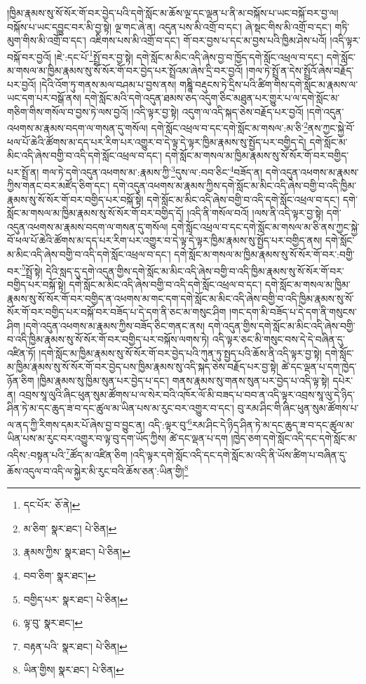 །ཁྱིམ་རྣམས་སུ་སོ་སོར་གོ་བར་བྱེད་པའི་དགེ་སློང་མ་ཆོས་ལྔ་དང་ལྡན་པ་ནི་མ་བསྐོས་པ་ཡང་བསྐོ་བར་བྱ་ལ། བསྐོས་པ་ཡང་དབྱུང་བར་མི་བྱ་སྟེ། ལྔ་གང་ཞེ་ན། འདུན་པས་མི་འགྲོ་བ་དང་། ཞེ་སྡང་གིས་མི་འགྲོ་བ་དང་། གཏི་མུག་གིས་མི་འགྲོ་བ་དང་། འཇིགས་པས་མི་འགྲོ་བ་དང་། གོ་བར་བྱས་པ་དང་མ་བྱས་པའི་ཁྱིམ་ཤེས་པའོ། །འདི་ལྟར་བསྐོ་བར་བྱའོ། །ཇེ་:དང་པོ་\footnote{དང་པོར་  ཅོ་ནེ། }སྤྲོ་བར་བྱ་སྟེ། དགེ་སློང་མ་མིང་འདི་ཞེས་བྱ་བ་ཁྱོད་དགེ་སློང་འཕྲལ་བ་དང་། དགེ་སློང་མ་གསལ་མ་ཁྱིམ་རྣམས་སུ་སོ་སོར་གོ་བར་བྱེད་པར་སྤྲོའམ་ཞེས་དྲི་བར་བྱའོ། །གལ་ཏེ་སྤྲོ་ན་དེས་སྤྲོའོ་ཞེས་བརྗོད་པར་བྱའོ། །དེའི་འོག་ཏུ་གནས་མལ་བཤམ་པ་བྱས་ནས། གཎྜཱི་བརྡུངས་ཏེ་དྲིས་པའི་ཚིག་གིས་དགེ་སློང་མ་རྣམས་ལ་ཡང་དག་པར་བསྒོ་ནས། དགེ་སློང་མའི་དགེ་འདུན་ཐམས་ཅད་འདུག་ཅིང་མཐུན་པར་གྱུར་པ་ལ་དགེ་སློང་མ་གཅིག་གིས་གསོལ་བ་བྱས་ཏེ་ལས་བྱའོ། །འདི་ལྟར་བྱ་སྟེ། འདུག་ལ་འདི་སྐད་ཅེས་བརྗོད་པར་བྱའོ། །དགེ་འདུན་འཕགས་མ་རྣམས་བདག་ལ་གསན་དུ་གསོལ། དགེ་སློང་འཕྲལ་བ་དང་དགེ་སློང་མ་གསལ་:མ་ཅི་\footnote{མ་ཅིག་  སྣར་ཐང་།  པེ་ཅིན། }ནས་ཀྱང་སྐྱེ་བོ་ཕལ་པོ་ཆེའི་ཚོགས་མ་དད་པར་རིག་པར་འགྱུར་བ་དེ་ལྟ་དེ་ལྟར་ཁྱིམ་རྣམས་སུ་སྤྱོད་པར་བགྱིད་དེ། དགེ་སློང་མ་མིང་འདི་ཞེས་བགྱི་བ་འདི་དགེ་སློང་འཕྲལ་བ་དང་། དགེ་སློང་མ་གསལ་མ་ཁྱིམ་རྣམས་སུ་སོ་སོར་གོ་བར་བགྱིད་པར་སྤྲོ་ན། གལ་ཏེ་དགེ་འདུན་འཕགས་མ་:རྣམས་ཀྱི་\footnote{རྣམས་ཀྱིས་  སྣར་ཐང་།  པེ་ཅིན། }དུས་ལ་:བབ་ཅིང་\footnote{བབ་ཅིག་  སྣར་ཐང་། }བཟོད་ན། དགེ་འདུན་འཕགས་མ་རྣམས་ཀྱིས་གནང་བར་མཛོད་ཅིག་དང་། དགེ་འདུན་འཕགས་མ་རྣམས་ཀྱིས་དགེ་སློང་མ་མིང་འདི་ཞེས་བགྱི་བ་འདི་ཁྱིམ་རྣམས་སུ་སོ་སོར་གོ་བར་བགྱིད་པར་བསྐོ་སྟེ། དགེ་སློང་མ་མིང་འདི་ཞེས་བགྱི་བ་འདི་དགེ་སློང་འཕྲལ་བ་དང་། དགེ་སློང་མ་གསལ་མ་ཁྱིམ་རྣམས་སུ་སོ་སོར་གོ་བར་བགྱིད་དོ། །འདི་ནི་གསོལ་བའོ། །ལས་ནི་འདི་ལྟར་བྱ་སྟེ། དགེ་འདུན་འཕགས་མ་རྣམས་བདག་ལ་གསན་དུ་གསོལ། དགེ་སློང་འཕྲལ་བ་དང་དགེ་སློང་མ་གསལ་མ་ཅི་ནས་ཀྱང་སྐྱེ་བོ་ཕལ་པོ་ཆེའི་ཚོགས་མ་དད་པར་རིག་པར་འགྱུར་བ་དེ་ལྟ་དེ་ལྟར་ཁྱིམ་རྣམས་སུ་སྤྱོད་པར་བགྱིད་ནས། དགེ་སློང་མ་མིང་འདི་ཞེས་བགྱི་བ་འདི་དགེ་སློང་འཕྲལ་བ་དང་། དགེ་སློང་མ་གསལ་མ་ཁྱིམ་རྣམས་སུ་སོ་སོར་གོ་བར་:བགྱི་བར་\footnote{བགྱིད་པར་  སྣར་ཐང་།  པེ་ཅིན། }སྤྲོ་སྟེ། དེའི་སླད་དུ་དགེ་འདུན་གྱིས་དགེ་སློང་མ་མིང་འདི་ཞེས་བགྱི་བ་འདི་ཁྱིམ་རྣམས་སུ་སོ་སོར་གོ་བར་བགྱིད་པར་བསྐོ་སྟེ། དགེ་སློང་མ་མིང་འདི་ཞེས་བགྱི་བ་འདི་དགེ་སློང་འཕྲལ་བ་དང་། དགེ་སློང་མ་གསལ་མ་ཁྱིམ་རྣམས་སུ་སོ་སོར་གོ་བར་བགྱིད་ན་འཕགས་མ་གང་དག་དགེ་སློང་མ་མིང་འདི་ཞེས་བགྱི་བ་འདི་ཁྱིམ་རྣམས་སུ་སོ་སོར་གོ་བར་བགྱིད་པར་བསྐོ་བར་བཟོད་པ་དེ་དག་ནི་ཅང་མ་གསུང་ཤིག །གང་དག་མི་བཟོད་པ་དེ་དག་ནི་གསུངས་ཤིག །དགེ་འདུན་འཕགས་མ་རྣམས་ཀྱིས་བཟོད་ཅིང་གནང་ནས། དགེ་འདུན་གྱིས་དགེ་སློང་མ་མིང་འདི་ཞེས་བགྱི་བ་འདི་ཁྱིམ་རྣམས་སུ་སོ་སོར་གོ་བར་བགྱིད་པར་བསྐོས་ལགས་ཏེ། འདི་ལྟར་ཅང་མི་གསུང་བས་དེ་དེ་བཞིན་དུ་འཛིན་ཏོ། །དགེ་སློང་མ་ཁྱིམ་རྣམས་སུ་སོ་སོར་གོ་བར་བྱེད་པའི་ཀུན་ཏུ་སྤྱད་པའི་ཆོས་ནི་འདི་ལྟར་བྱ་སྟེ། དགེ་སློང་མ་ཁྱིམ་རྣམས་སུ་སོ་སོར་གོ་བར་བྱེད་པས་ཁྱིམ་རྣམས་སུ་འདི་སྐད་ཅེས་བརྗོད་པར་བྱ་སྟེ། ཚེ་དང་ལྡན་པ་དག་ཁྱེད་ཉོན་ཅིག །ཁྱིམ་རྣམས་སུ་ཁྱིམ་སུན་པར་བྱེད་པ་དང་། གནས་རྣམས་སུ་གནས་སུན་པར་བྱེད་པ་འདི་ལྟ་སྟེ། དཔེར་ན། འབྲས་སཱ་ལུའི་ཞིང་ཕུན་སུམ་ཚོགས་པ་ལ་སེར་བའི་འཁོར་ལོ་མི་བཟད་པ་བབ་ན་འདི་ལྟར་འབྲས་སཱ་ལུ་དེ་ཉིད་ཤིན་ཏེ་མ་དང་ཆུད་ཟ་བ་དང་ཚུལ་མ་ཡིན་པས་མ་རུང་བར་འགྱུར་བ་དང་། བུ་རམ་ཤིང་གི་ཞིང་ཕུན་སུམ་ཚོགས་པ་ལ་ནད་ཀྱི་རིགས་དམར་པོ་ཞེས་བྱ་བ་བྱུང་ན། འདི་:ལྟར་བུ་\footnote{ལྟ་བུ་  སྣར་ཐང་། }རམ་ཤིང་དེ་ཉིད་ཤིན་ཏེ་མ་དང་ཆུད་ཟ་བ་དང་ཚུལ་མ་ཡིན་པས་མ་རུང་བར་འགྱུར་བ་ལྟ་བུ་དག་ཡོད་ཀྱིས། ཚེ་དང་ལྡན་པ་དག །ཁྱེད་ཅག་དགེ་སློང་འདི་དང་དགེ་སློང་མ་འདིས་:བསྟན་པའི་\footnote{བརྟན་པའི་  སྣར་ཐང་།  པེ་ཅིན། }ཚོད་མ་འཛིན་ཅིག །འདི་ལྟར་དགེ་སློང་འདི་དང་དགེ་སློང་མ་འདི་ནི་ཡོས་ཚིག་པ་བཞིན་དུ་ཆོས་འདུལ་བ་འདི་ལ་སྐྱེར་མི་རུང་བའི་ཆོས་ཅན་:ཡིན་གྱི།\footnote{ཡིན་གྱིས།  སྣར་ཐང་།  པེ་ཅིན། } 